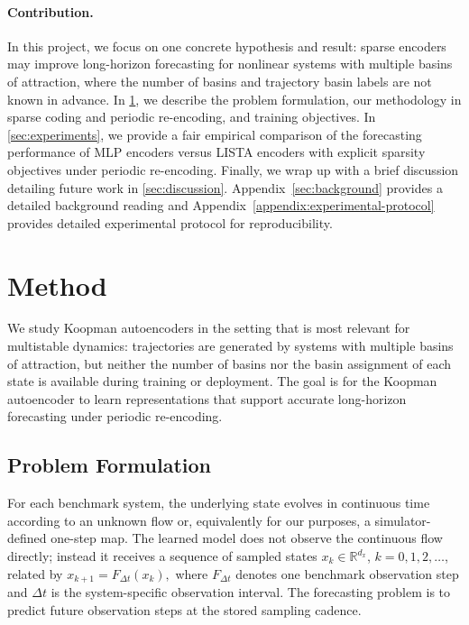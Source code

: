 \documentclass{article}
\begin{document}
\paragraph{Contribution.} In this project, we focus on one concrete hypothesis and result: sparse encoders may improve long-horizon forecasting for nonlinear systems with multiple basins of attraction, where the number of basins and trajectory basin labels are not known in advance. 
In \cref{sec:method}, we describe the problem formulation, our methodology in sparse coding and periodic re-encoding, and training objectives. 
In \cref{sec:experiments}, we provide a fair empirical comparison of the forecasting performance of MLP encoders versus LISTA encoders with explicit sparsity objectives under periodic re-encoding.
Finally, we wrap up with a brief discussion detailing future work in \cref{sec:discussion}. Appendix~\ref{sec:background} provides a detailed background reading and Appendix~\ref{appendix:experimental-protocol} provides detailed experimental protocol for reproducibility.


\section{Method}
\label{sec:method}

We study Koopman autoencoders in the setting that is most relevant for multistable dynamics: trajectories are generated by systems with multiple basins of attraction, but neither the number of basins nor the basin assignment of each state is available during training or deployment. The goal is for the Koopman autoencoder to learn representations that support accurate long-horizon forecasting under periodic re-encoding. 

\subsection{Problem Formulation}

For each benchmark system, the underlying state evolves in continuous time according to an unknown flow or, equivalently for our purposes, a simulator-defined one-step map.  
The learned model does not observe the continuous flow directly; instead it receives a sequence of sampled states \(x_k \in \mathbb{R}^{d_x}\), \(k=0,1,2,\dots\), related by 
$x_{k+1} = F_{\Delta t}(x_k),$ 
where \(F_{\Delta t}\) denotes one benchmark observation step and \(\Delta t\) is the system-specific observation interval. The forecasting problem is to predict future observation steps at the stored sampling cadence.
\end{document}

